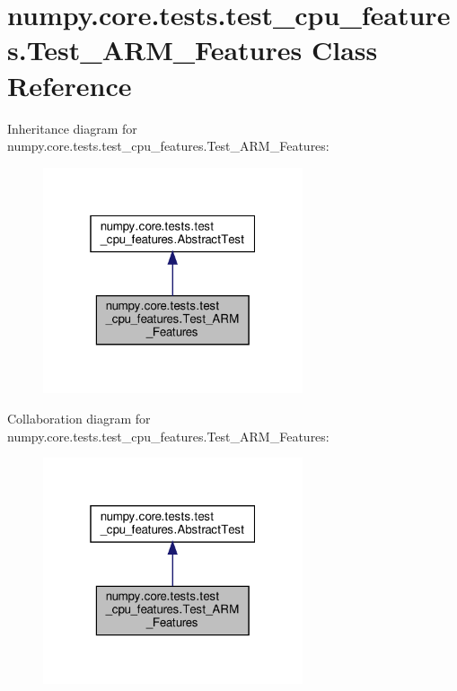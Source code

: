\hypertarget{classnumpy_1_1core_1_1tests_1_1test__cpu__features_1_1Test__ARM__Features}{}\section{numpy.\+core.\+tests.\+test\+\_\+cpu\+\_\+features.\+Test\+\_\+\+A\+R\+M\+\_\+\+Features Class Reference}
\label{classnumpy_1_1core_1_1tests_1_1test__cpu__features_1_1Test__ARM__Features}


Inheritance diagram for numpy.\+core.\+tests.\+test\+\_\+cpu\+\_\+features.\+Test\+\_\+\+A\+R\+M\+\_\+\+Features\+:
\nopagebreak
\begin{figure}[H]
\begin{center}
\leavevmode
\includegraphics[width=217pt]{classnumpy_1_1core_1_1tests_1_1test__cpu__features_1_1Test__ARM__Features__inherit__graph}
\end{center}
\end{figure}


Collaboration diagram for numpy.\+core.\+tests.\+test\+\_\+cpu\+\_\+features.\+Test\+\_\+\+A\+R\+M\+\_\+\+Features\+:
\nopagebreak
\begin{figure}[H]
\begin{center}
\leavevmode
\includegraphics[width=217pt]{classnumpy_1_1core_1_1tests_1_1test__cpu__features_1_1Test__ARM__Features__coll__graph}
\end{center}
\end{figure}
